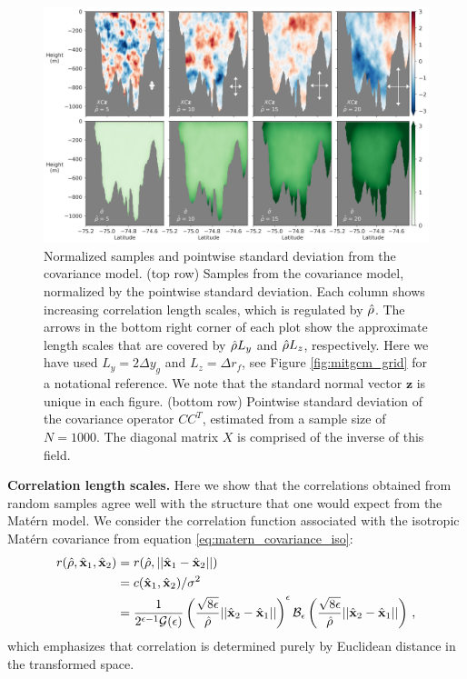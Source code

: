 \begin{figure}
    \centering
    \includegraphics[width=\textwidth]{../figures/samples_and_pointwise_std.jpg}
    \caption{Normalized samples and pointwise standard deviation from the covariance
        model.
        (top row) Samples from the covariance model, normalized by the
        pointwise standard deviation. Each column shows increasing correlation
        length scales, which is regulated by $\hat{\rho}$.
        The arrows in the bottom right corner of each plot show the approximate length scales
        that are covered by $\hat{\rho} L_y$ and $\hat{\rho} L_z$, respectively.
        Here we have used $L_y = 2\Delta y_g$ and $L_z=\Delta r_f$, see
        Figure \ref{fig:mitgcm_grid} for a notational reference.
        We note that the standard normal vector $\mathbf{z}$ is unique in
        each figure.
        (bottom row) Pointwise standard deviation of the covariance operator
        $CC^T$, estimated from
        a sample size of $N=1000$. The diagonal matrix $X$ is comprised of the
        inverse of this field.
    }
    \label{fig:matern_samples}
\end{figure}


\noindent\textbf{Correlation length scales.}
Here we show that the correlations obtained from random samples agree well with
the structure that one would expect from the Mat\'ern model.
We consider the correlation function associated with the isotropic Mat\'ern
covariance from equation \eqref{eq:matern_covariance_iso}:
\begin{equation*}
    \begin{aligned}
        r(\hat{\rho},\hat{\mathbf{x}}_1,\hat{\mathbf{x}}_2) &= r(\hat{\rho}, ||\hat{\mathbf{x}}_1-\hat{\mathbf{x}}_2||) \\
                       &= c(\hat{\mathbf{x}}_1,\hat{\mathbf{x}}_2)/\sigma^2 \\
                       &= \dfrac{1}{2^{\epsilon-1}\mathcal{G}(\epsilon)}
        \left(\dfrac{\sqrt{8\epsilon}}{\hat{\rho}} ||\hat{\mathbf{x}}_2-\hat{\mathbf{x}}_1||\right)^{\epsilon}
        \mathcal{B}_{\epsilon}
        \left(\dfrac{\sqrt{8\epsilon}}{\hat{\rho}} ||\hat{\mathbf{x}}_2-\hat{\mathbf{x}}_1||\right) \, ,
    \end{aligned}
\end{equation*}
which emphasizes that correlation is determined purely by Euclidean distance in
the transformed space.

